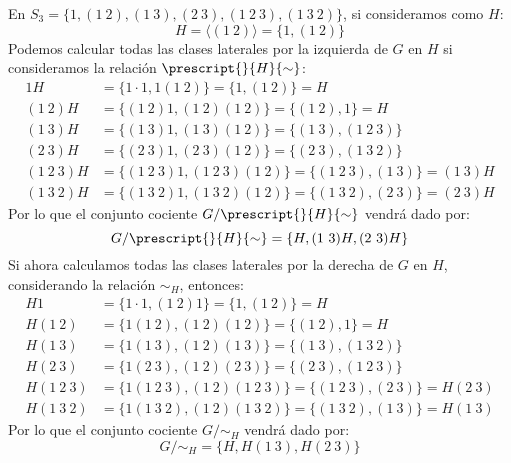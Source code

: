 \begin{ejemplo}
    En $S_3 = \{1, (1\ 2), (1\ 3), (2\ 3), (1\ 2\ 3), (1\ 3\ 2)\}$, si consideramos como $H$:
    \begin{equation*}
        H = \langle (1\ 2) \rangle  = \{1, (1\ 2)\}
    \end{equation*}
    Podemos calcular todas las clases laterales por la izquierda de $G$ en $H$ si consideramos la relación $\prescript{}{H}{\sim}$:
    \begin{align*}
        1H &= \{1\cdot 1, 1(1\ 2)\} = \{1, (1\ 2)\} = H \\
        (1\ 2)H &= \{(1\ 2)1, (1\ 2)(1\ 2)\} = \{(1\ 2), 1\} = H \\
        (1\ 3)H &= \{(1\ 3)1, (1\ 3)(1\ 2)\} = \{(1\ 3), (1\ 2\ 3)\} \\
        (2\ 3)H &= \{(2\ 3)1, (2\ 3)(1\ 2)\} = \{(2\ 3), (1\ 3\ 2)\} \\
        (1\ 2\ 3)H &= \{(1\ 2\ 3)1, (1\ 2\ 3)(1\ 2)\} = \{(1\ 2\ 3), (1\ 3)\} = (1\ 3)H \\
        (1\ 3\ 2)H &= \{(1\ 3\ 2)1, (1\ 3\ 2)(1\ 2)\} = \{(1\ 3\ 2), (2\ 3)\} = (2\ 3)H
    \end{align*} 
    Por lo que el conjunto cociente $G/\prescript{}{H}{\sim}$ vendrá dado por:
    \begin{equation*}
        G/\prescript{}{H}{\sim} = \{H, (1\ 3)H, (2\ 3)H\}
    \end{equation*}
    Si ahora calculamos todas las clases laterales por la derecha de $G$ en $H$, considerando la relación $\sim_H$, entonces:
    \begin{align*}
        H1 &= \{1\cdot 1, (1\ 2)1\} = \{1, (1\ 2)\} = H \\
        H(1\ 2) &= \{1(1\ 2), (1\ 2)(1\ 2)\} = \{(1\ 2), 1\} = H \\
        H(1\ 3) &= \{1(1\ 3), (1\ 2)(1\ 3)\} = \{(1\ 3), (1\ 3\ 2)\} \\
        H(2\ 3) &= \{1(2\ 3), (1\ 2)(2\ 3)\} = \{(2\ 3), (1\ 2\ 3)\} \\
        H(1\ 2\ 3) &= \{1(1\ 2\ 3), (1\ 2)(1\ 2\ 3)\} = \{(1\ 2\ 3), (2\ 3)\} = H(2\ 3) \\
        H(1\ 3\ 2) &= \{1(1\ 3\ 2), (1\ 2)(1\ 3\ 2)\} = \{(1\ 3\ 2), (1\ 3)\} = H(1\ 3)
    \end{align*}
    Por lo que el conjunto cociente $G/\sim_H$ vendrá dado por:
    \begin{equation*}
        G/\sim_H = \{H, H(1\ 3), H(2\ 3)\}
    \end{equation*}
\end{ejemplo}

